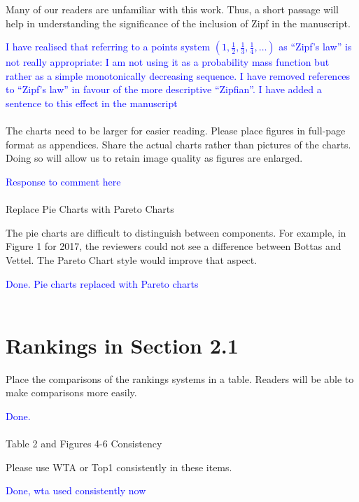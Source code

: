 \documentclass[12pt]{article}
\begin{document}
Many of our readers are unfamiliar with this work.  Thus, a short
passage will help in understanding the significance of the inclusion
of Zipf in the manuscript.

\textcolor{blue}{I have realised that referring to a points system
  $\left(1,\frac{1}{2},\frac{1}{3},\frac{1}{4},\ldots\right)$ as
  ``Zipf's law'' is not really appropriate: I am not using it as a
  probability mass function but rather as a simple monotonically
  decreasing sequence.  I have removed references to ``Zipf's law'' in
  favour of the more descriptive ``Zipfian''.  I have added a sentence
  to this effect in the manuscript}\\ \\

The charts need to be larger for easier reading.  Please place figures
in full-page format as appendices.  Share the actual charts rather
than pictures of the charts.  Doing so will allow us to retain image
quality as figures are enlarged.

\textcolor{blue}{Response to comment here}\\ \\

Replace Pie Charts with Pareto Charts

The pie charts are difficult to distinguish between components. For
example, in Figure 1 for 2017, the reviewers could not see a
difference between Bottas and Vettel.  The Pareto Chart style would
improve that aspect.

\textcolor{blue}{Done.  Pie charts replaced with Pareto charts}\\ \\


\section*{Rankings in Section 2.1}

Place the comparisons of the rankings systems in a table.  Readers will
be able to make comparisons more easily.

\textcolor{blue}{Done.}\\ \\

Table 2 and Figures 4-6 Consistency

Please use WTA or Top1 consistently in these items.

\textcolor{blue}{Done, wta used consistently now}\\ \\
\end{document}
